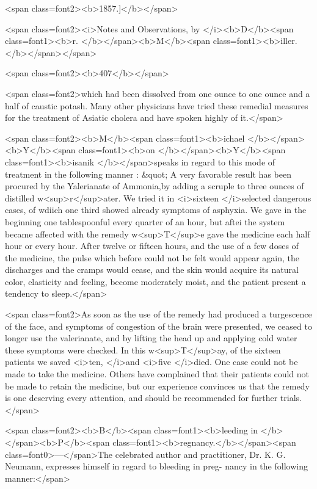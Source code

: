 <span class=font2><b>1857.]</b></span>

<span class=font2><i>Notes and Observations, by </i><b>D</b><span class=font1><b>r. </b></span><b>M</b><span class=font1><b>iller.</b></span></span>

<span class=font2><b>407</b></span>

<span class=font2>which had been dissolved from one ounce to one ounce and a half of
caustic potash. Many other physicians have tried these remedial
measures for the treatment of Asiatic cholera and have spoken highly
of it.</span>

<span class=font2><b>M</b><span class=font1><b>ichael </b></span><b>Y</b><span class=font1><b>on </b></span><b>Y</b><span class=font1><b>isanik </b></span>speaks in regard to this mode of treatment
in the following manner : &quot; A very favorable result has been procured
by the Yalerianate of Ammonia,by adding a scruple to three ounces of
distilled w<sup>r</sup>ater. We tried it in <i>sixteen </i>selected dangerous cases, of
wdiich one third showed already symptoms of asphyxia. We gave in
the beginning one tablespoonful every quarter of an hour, but aftei
the system became affected with the remedy w<sup>T</sup>e gave the medicine
each half hour or every hour. After twelve or fifteen hours, and the
use of a few doses of the medicine, the pulse which before could not
be felt would appear again, the discharges and the cramps would cease,
and the skin would acquire its natural color, elasticity and feeling,
become moderately moist, and the patient present a tendency to sleep.</span>

<span class=font2>As soon as the use of the remedy had produced a turgescence of the
face, and symptoms of congestion of the brain were presented, we
ceased to longer use the valerianate, and by lifting the head up and
applying cold water these symptoms were checked. In this w<sup>T</sup>ay, of
the sixteen patients we saved <i>ten, </i>and <i>five </i>died. One case could not
be made to take the medicine. Others have complained that their
patients could not be made to retain the medicine, but our experience
convinces us that the remedy is one deserving every attention, and
should be recommended for further trials.</span>

<span class=font2><b>B</b><span class=font1><b>leeding in </b></span><b>P</b><span class=font1><b>regnancy.</b></span><span class=font0>—</span>The celebrated author and practitioner,
Dr. K. G. Neumann, expresses himself in regard to bleeding in preg-
nancy in the following manner:</span>

